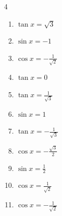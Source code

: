 \begin{multicols}{4}
\begin{enumerate}
  \item $\displaystyle \tan{x}  = \sqrt{3}$


  \item $\displaystyle \sin{x}  = -1$


  \item $\displaystyle \cos{x}  = -\frac{1}{\sqrt{2}}$


  \item $\displaystyle \tan{x}  = 0$

        \phantom{$\displaystyle x = 0 , \pi$}

  \item $\displaystyle \tan{x}  = \frac{1}{\sqrt{3}}$


  \item $\displaystyle \sin{x}  = 1$


  \item $\displaystyle \tan{x}  = -\frac{1}{\sqrt{3}}$


  \item $\displaystyle \cos{x}  = -\frac{\sqrt{3}}{2}$


  \item $\displaystyle \sin{x}  = \frac{1}{2}$


  \item $\displaystyle \cos{x}  = \frac{1}{\sqrt{2}}$


  \item $\displaystyle \cos{x}  = -\frac{1}{\sqrt{2}}$


\columnbreak %


\end{enumerate}
\end{multicols}
